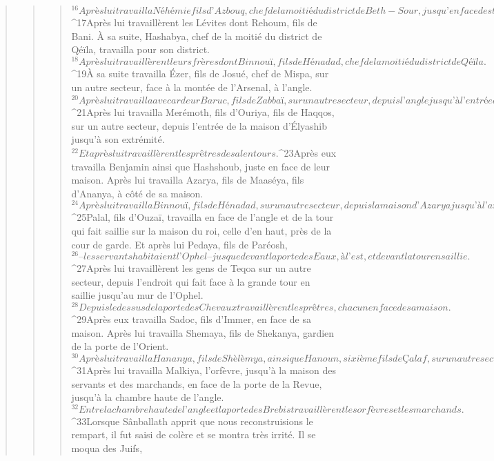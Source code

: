 \begin{verse}
\begin{verse}
\begin{verse}
${}^{16}Après lui travailla Néhémie fils d’Azbouq, chef de la moitié du district de Beth-Sour, jusqu’en face des tombeaux de David, jusqu’au réservoir artificiel et jusqu’à la maison des Vaillants. 
${}^{17}Après lui travaillèrent les Lévites dont Rehoum, fils de Bani. À sa suite, Hashabya, chef de la moitié du district de Qéïla, travailla pour son district. 
${}^{18}Après lui travaillèrent leurs frères dont Binnouï, fils de Hénadad, chef de la moitié du district de Qéïla. 
${}^{19}À sa suite travailla Ézer, fils de Josué, chef de Mispa, sur un autre secteur, face à la montée de l’Arsenal, à l’angle. 
${}^{20}Après lui travailla avec ardeur Baruc, fils de Zabbaï, sur un autre secteur, depuis l’angle jusqu’à l’entrée de la maison d’Élyashib, le grand prêtre. 
${}^{21}Après lui travailla Merémoth, fils d’Ouriya, fils de Haqqos, sur un autre secteur, depuis l’entrée de la maison d’Élyashib jusqu’à son extrémité. 
${}^{22}Et après lui travaillèrent les prêtres des alentours. 
${}^{23}Après eux travailla Benjamin ainsi que Hashshoub, juste en face de leur maison. Après lui travailla Azarya, fils de Maaséya, fils d’Ananya, à côté de sa maison. 
${}^{24}Après lui travailla Binnouï, fils de Hénadad, sur un autre secteur, depuis la maison d’Azarya jusqu’à l’angle et jusqu’au coin. 
${}^{25}Palal, fils d’Ouzaï, travailla en face de l’angle et de la tour qui fait saillie sur la maison du roi, celle d’en haut, près de la cour de garde. Et après lui Pedaya, fils de Paréosh, 
${}^{26}– les servants habitaient l’Ophel – jusque devant la porte des Eaux, à l’est, et devant la tour en saillie. 
${}^{27}Après lui travaillèrent les gens de Teqoa sur un autre secteur, depuis l’endroit qui fait face à la grande tour en saillie jusqu’au mur de l’Ophel. 
${}^{28}Depuis le dessus de la porte des Chevaux travaillèrent les prêtres, chacun en face de sa maison. 
${}^{29}Après eux travailla Sadoc, fils d’Immer, en face de sa maison. Après lui travailla Shemaya, fils de Shekanya, gardien de la porte de l’Orient. 
${}^{30}Après lui travailla Hananya, fils de Shèlèmya, ainsi que Hanoun, sixième fils de Çalaf, sur un autre secteur. Après lui travailla Meshoullam, fils de Bèrèkya, en face de son logement. 
${}^{31}Après lui travailla Malkiya, l’orfèvre, jusqu’à la maison des servants et des marchands, en face de la porte de la Revue, jusqu’à la chambre haute de l’angle. 
${}^{32}Entre la chambre haute de l’angle et la porte des Brebis travaillèrent les orfèvres et les marchands.
${}^{33}Lorsque Sânballath apprit que nous reconstruisions le rempart, il fut saisi de colère et se montra très irrité. Il se moqua des Juifs, 

\end{verse}
\end{verse}
\end{verse}
